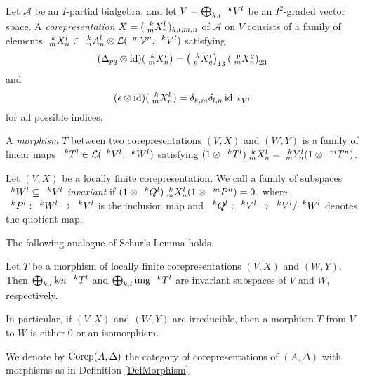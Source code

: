 \begin{Def} Let $\mathscr{A}$ be an $I$-partial bialgebra, and let $V=\bigoplus_{k,l} \Gru{V}{k}{l}$ be an $I^{2}$-graded vector space.
A \emph{corepresentation}  $X=(\Gr{X}{k}{l}{m}{n})_{k,l,m,n}$ of $\mathscr{A}$ on $V$ consists of a family of elements 
  $\Gr{X}{k}{l}{m}{n} \in \Gr{A}{k}{l}{m}{n} \otimes
  \mathcal{L}(\Gru{\Vv}{m}{n},\Gru{V}{k}{l})$
  satisfying
  \begin{align} \label{eq:rep-delta}
    (\Delta_{pq} \otimes \id)(\Gr{X}{k}{l}{m}{n}) =
    \left(\Gr{X}{k}{l}{p}{q}\right)_{13}\left(\Gr{X}{p}{q}{m}{n}\right)_{23}
  \end{align}
and   \[(\epsilon \otimes
    \id)(\Gr{X}{k}{l}{m}{n})=\delta_{k,m}\delta_{l,n}\id_{\Gru{V}{k}{l}}\] 
for all possible indices.
\end{Def} %

\begin{Def}\label{DefMorphism} A \emph{morphism} $T$ between two corepresentations
$(V,X)$ and $(W,Y)$ is a family of linear maps
$\Gru{T}{k}{l} \in
\mathcal{L}(\Gru{V}{k}{l},\Gru{W}{k}{l})$
satisfying $(1 \otimes \Gru{T}{k}{l})\Gr{X}{k}{l}{m}{n} =
\Gr{Y}{k}{l}{m}{n}(1 \otimes \Gru{T}{m}{n})$.
\end{Def}

\begin{Def} Let $(V,X)$ be a locally finite
corepresentation. We call a family of subspaces
$\Gru{W}{k}{l} \subseteq \Gru{V}{k}{l}$
\emph{invariant} if $(1\otimes \Gru{Q}{k}{l})\Gr{X}{k}{l}{m}{n}(1 \otimes \Gru{P}{m}{n}) =0$,
where $\Gru{P}{k}{l}:\Gru{W}{k}{l}\to\Gru{V}{k}{l}$ is the inclusion map and $\Gru{Q}{k}{l}:\Gru{V}{k}{l}\to\Gru{V}{k}{l}/\Gru{W}{k}{l}$
denotes the quotient map.
\end{Def}

The following analogue of Schur's Lemma holds.

\begin{Lem} Let $T$ be a morphism
of locally finite corepresentations $(V,X)$ and
$(W,Y)$. Then $ \bigoplus_{k,l} \ker \Gru{T}{k}{l}$ and
$\bigoplus_{k,l} \img \Gru{T}{k}{l}$ are invariant subspaces of
$V$ and $W$, respectively.
\end{Lem} 

In particular, if $(V,X)$ and $(W,Y)$ are irreducible, then a morphism $T$ from $V$ to $W$ is
either $0$ or an isomorphism.

\begin{Def} We denote by $\Corep(A,\Delta)$ the category of corepresentations of $(A,\Delta)$ with morphisms as in Definition \ref{DefMorphism}.
\end{Def}

